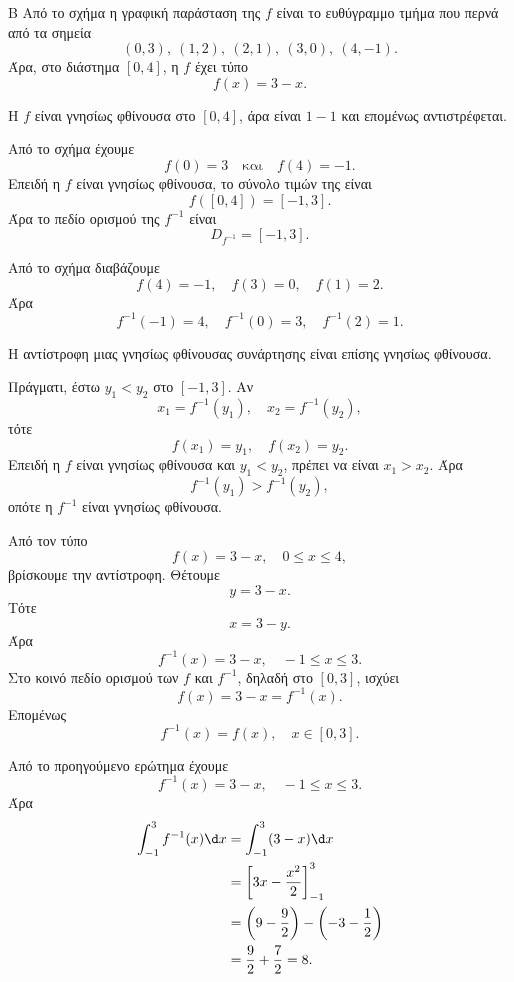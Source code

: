 \begin{thema}{Β}
Από το σχήμα η γραφική παράσταση της $f$ είναι το ευθύγραμμο τμήμα που περνά από τα σημεία
\[
(0,3),\ (1,2),\ (2,1),\ (3,0),\ (4,-1).
\]
Άρα, στο διάστημα $[0,4]$, η $f$ έχει τύπο
\[
f(x)=3-x.
\]

\begin{erwthma}
\item Η $f$ είναι γνησίως φθίνουσα στο $[0,4]$, άρα είναι $1-1$ και επομένως αντιστρέφεται.

Από το σχήμα έχουμε
\[
f(0)=3
\quad\text{και}\quad
f(4)=-1.
\]
Επειδή η $f$ είναι γνησίως φθίνουσα, το σύνολο τιμών της είναι
\[
f([0,4])=[-1,3].
\]
Άρα το πεδίο ορισμού της $f^{-1}$ είναι
\[
D_{f^{-1}}=[-1,3].
\]

\item Από το σχήμα διαβάζουμε
\[
f(4)=-1,\quad f(3)=0,\quad f(1)=2.
\]
Άρα
\[
f^{-1}(-1)=4,\quad f^{-1}(0)=3,\quad f^{-1}(2)=1.
\]

\item Η αντίστροφη μιας γνησίως φθίνουσας συνάρτησης είναι επίσης γνησίως φθίνουσα.

Πράγματι, έστω $y_1<y_2$ στο $[-1,3]$. Αν
\[
x_1=f^{-1}(y_1),\quad x_2=f^{-1}(y_2),
\]
τότε
\[
f(x_1)=y_1,\quad f(x_2)=y_2.
\]
Επειδή η $f$ είναι γνησίως φθίνουσα και $y_1<y_2$, πρέπει να είναι $x_1>x_2$. Άρα
\[
f^{-1}(y_1)>f^{-1}(y_2),
\]
οπότε η $f^{-1}$ είναι γνησίως φθίνουσα.

\item Από τον τύπο
\[
f(x)=3-x,\quad 0\leq x\leq 4,
\]
βρίσκουμε την αντίστροφη. Θέτουμε
\[
y=3-x.
\]
Τότε
\[
x=3-y.
\]
Άρα
\[
f^{-1}(x)=3-x,\quad -1\leq x\leq 3.
\]
Στο κοινό πεδίο ορισμού των $f$ και $f^{-1}$, δηλαδή στο $[0,3]$, ισχύει
\[
f(x)=3-x=f^{-1}(x).
\]
Επομένως
\[
f^{-1}(x)=f(x),\quad x\in[0,3].
\]

\item Από το προηγούμενο ερώτημα έχουμε
\[
f^{-1}(x)=3-x,\quad -1\leq x\leq 3.
\]
Άρα
\begin{align*}
\dint_{-1}^{3} f^{-1}(x)\d x
&=\dint_{-1}^{3}(3-x)\d x\\
&=\left[3x-\frac{x^2}{2}\right]_{-1}^{3}\\
&=\left(9-\frac{9}{2}\right)-\left(-3-\frac{1}{2}\right)\\
&=\frac{9}{2}+\frac{7}{2}=8.
\end{align*}
\end{erwthma}
\end{thema}


